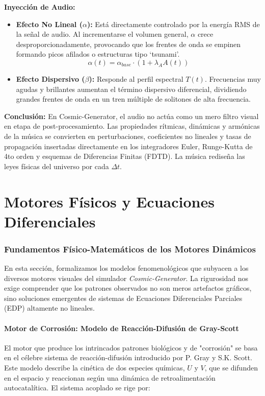 \documentclass[12pt]{book}
\begin{document}
\textbf{Inyección de Audio:}
\begin{itemize}
    \item \textbf{Efecto No Lineal ($\alpha$):} Está directamente controlado por la energía RMS de la señal de audio. Al incrementarse el volumen general, $\alpha$ crece desproporcionadamente, provocando que los frentes de onda se empinen formando picos afilados o estructuras tipo `tsunami'.
    $$\alpha(t) = \alpha_{base} \cdot (1 + \lambda_A A(t))$$
    \item \textbf{Efecto Dispersivo ($\beta$):} Responde al perfil espectral $T(t)$. Frecuencias muy agudas y brillantes aumentan el término dispersivo diferencial, dividiendo grandes frentes de onda en un tren múltiple de solitones de alta frecuencia.
\end{itemize}

\vspace{0.5cm}
\textbf{Conclusión:}
En Cosmic-Generator, el audio no actúa como un mero filtro visual en etapa de post-procesamiento. Las propiedades rítmicas, dinámicas y armónicas de la música se convierten en perturbaciones, coeficientes no lineales y tasas de propagación insertadas directamente en los integradores Euler, Runge-Kutta de 4to orden y esquemas de Diferencias Finitas (FDTD). La música rediseña las leyes físicas del universo por cada $\Delta t$.

\part{Motores Físicos y Ecuaciones Diferenciales}

\section{Fundamentos Físico-Matemáticos de los Motores Dinámicos}
\label{sec:fundamentos_motores}

En esta sección, formalizamos los modelos fenomenológicos que subyacen a los diversos motores visuales del simulador \textit{Cosmic-Generator}. La rigurosidad nos exige comprender que los patrones observados no son meros artefactos gráficos, sino soluciones emergentes de sistemas de Ecuaciones Diferenciales Parciales (EDP) altamente no lineales.

\subsection{Motor de Corrosión: Modelo de Reacción-Difusión de Gray-Scott}
El motor que produce los intrincados patrones biológicos y de "corrosión" se basa en el célebre sistema de reacción-difusión introducido por P. Gray y S.K. Scott. Este modelo describe la cinética de dos especies químicas, $U$ y $V$, que se difunden en el espacio y reaccionan según una dinámica de retroalimentación autocatalítica. El sistema acoplado se rige por:
\end{document}
